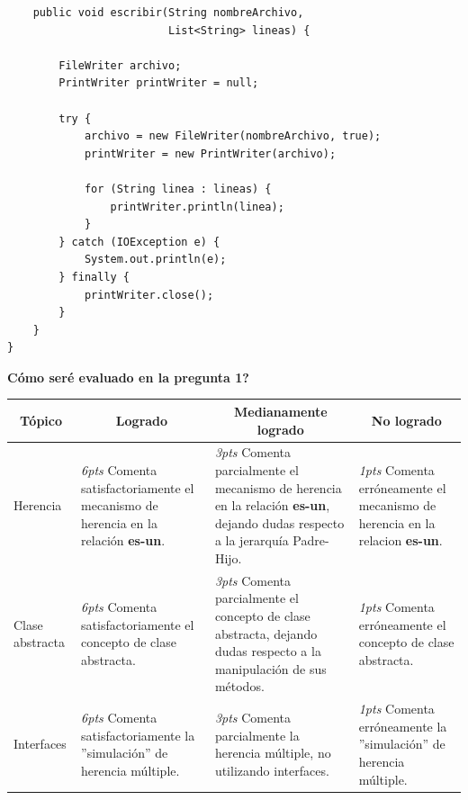 \documentclass[10pt]{article}
\begin{document}
{\begin{multicols}{2}
\begin{verbatim}
    public void escribir(String nombreArchivo, 
                         List<String> lineas) {

        FileWriter archivo;
        PrintWriter printWriter = null;

        try {
            archivo = new FileWriter(nombreArchivo, true);
            printWriter = new PrintWriter(archivo);

            for (String linea : lineas) {
                printWriter.println(linea);
            }
        } catch (IOException e) {
            System.out.println(e);
        } finally {
            printWriter.close();
        }
    }
}
            \end{verbatim}
        \end{multicols}
        \vspace*{-20pt}
        \begin{center}
            \textbf{\textquestiondown C\'omo ser\'e evaluado en la pregunta 1?} \linebreak
            \begin{tabular}{|p{2cm}|p{4cm}|p{4cm}|p{4cm}|}\hline
                \multicolumn{1}{|c|}{\textbf{T\'opico}} & 
                \multicolumn{1}{c|}{\textbf{Logrado}} & 
                \multicolumn{1}{c|}{\textbf{Medianamente logrado}} & 
                \multicolumn{1}{c|}{\textbf{No logrado}} \\ \hline
                Herencia & 
                \emph{6pts} Comenta satisfactoriamente el mecanismo de herencia en la relaci\'on \textbf{es-un}. & 
                \emph{3pts} Comenta parcialmente el mecanismo de herencia en la relaci\'on \textbf{es-un}, dejando dudas respecto a la jerarqu\'ia Padre-Hijo. & 
                \emph{1pts} Comenta err\'oneamente el mecanismo de herencia en la relacion \textbf{es-un}.\\ \hline
                Clase abstracta & 
                \emph{6pts} Comenta satisfactoriamente el concepto de clase abstracta. & 
                \emph{3pts} Comenta parcialmente el concepto de clase abstracta, dejando dudas respecto a la manipulaci\'on de sus m\'etodos. & 
                \emph{1pts} Comenta err\'oneamente el concepto de clase abstracta.\\ \hline
                Interfaces & 
                \emph{6pts} Comenta satisfactoriamente la ''simulaci\'on'' de herencia m\'ultiple. & 
                \emph{3pts} Comenta parcialmente la herencia m\'ultiple, no utilizando interfaces. & 
                \emph{1pts} Comenta err\'oneamente la ''simulaci\'on'' de herencia m\'ultiple. \\ \hline

\end{tabular}
\end{center}}
\end{document}
